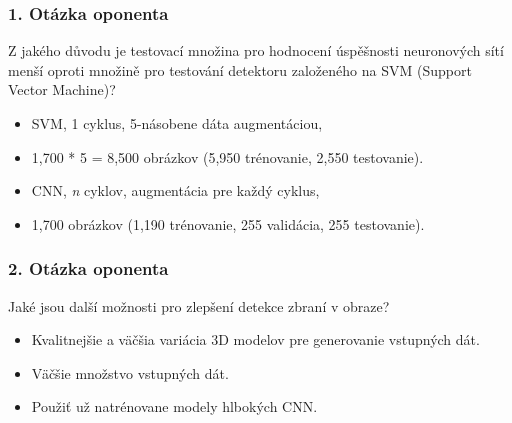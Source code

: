 \documentclass[10pt,xcolor=pdflatex]{beamer}
\begin{document}
\appendix


\addtocounter{framenumber}{-\value{framenumber}} %

\begin{frame}
\frametitle{1. Otázka oponenta}
    Z jakého důvodu je testovací množina pro hodnocení úspěšnosti neuronových sítí menší oproti množině pro testování detektoru založeného na SVM (Support Vector Machine)?
    \vspace{0.3cm}
    \begin{itemize}
        \item SVM, 1 cyklus, 5-násobene dáta augmentáciou,
        \item 1,700 * 5 = 8,500 obrázkov (5,950 trénovanie, 2,550 testovanie).
        \vspace{0.2cm}
        \item CNN, \textit{n} cyklov, augmentácia pre každý cyklus,
        \item 1,700 obrázkov (1,190 trénovanie, 255 validácia, 255 testovanie).
    \end{itemize}
\end{frame}

\begin{frame}
\frametitle{2. Otázka oponenta}
    Jaké jsou další možnosti pro zlepšení detekce zbraní v obraze?
    \vspace{0.3cm}
    \begin{itemize}
        \item Kvalitnejšie a väčšia variácia 3D modelov pre generovanie vstupných dát.
        \item Väčšie množstvo vstupných dát.
        \item Použiť už natrénovane modely hlbokých CNN.
    \end{itemize}
\end{frame}
\end{document}
